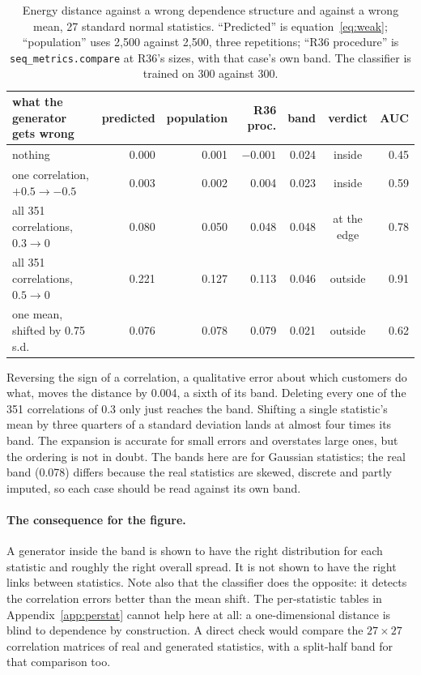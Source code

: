 \documentclass[11pt]{article}
\begin{document}
\begin{table}[h]
\centering
\small
\caption{Energy distance against a wrong dependence structure and against a
wrong mean, 27 standard normal statistics. ``Predicted'' is
equation~\eqref{eq:weak}; ``population'' uses 2,500 against 2,500, three
repetitions; ``R36 procedure'' is \texttt{seq\_metrics.compare} at R36's sizes,
with that case's own band. The classifier is trained on 300 against 300.}
\label{tab:weak}
\begin{tabular}{@{}lrrrrcr@{}}
\toprule
what the generator gets wrong & predicted & population & R36 proc. & band & verdict & AUC \\
\midrule
nothing & 0.000 & 0.001 & $-0.001$ & 0.024 & inside & 0.45 \\
one correlation, $+0.5 \to -0.5$ & 0.003 & 0.002 & 0.004 & 0.023 & inside & 0.59 \\
all 351 correlations, $0.3 \to 0$ & 0.080 & 0.050 & 0.048 & 0.048 & at the edge & 0.78 \\
all 351 correlations, $0.5 \to 0$ & 0.221 & 0.127 & 0.113 & 0.046 & outside & 0.91 \\
one mean, shifted by 0.75 s.d. & 0.076 & 0.078 & 0.079 & 0.021 & outside & 0.62 \\
\bottomrule
\end{tabular}
\end{table}

\noindent Reversing the sign of a correlation, a qualitative error about which
customers do what, moves the distance by 0.004, a sixth of its band. Deleting
every one of the 351 correlations of 0.3 only just reaches the band. Shifting a
single statistic's mean by three quarters of a standard deviation lands at
almost four times its band. The expansion is accurate for small errors and
overstates large ones, but the ordering is not in doubt. The bands here are for
Gaussian statistics; the real band (0.078) differs because the real statistics
are skewed, discrete and partly imputed, so each case should be read against
its own band.

\paragraph{The consequence for the figure.} A generator inside the band is
shown to have the right distribution for each statistic and roughly the right
overall spread. It is not shown to have the right links between statistics.
Note also that the classifier does the opposite: it detects the correlation
errors better than the mean shift. The per-statistic tables in
Appendix~\ref{app:perstat} cannot help here at all: a one-dimensional distance
is blind to dependence by construction. A direct check would compare the
$27\times27$ correlation matrices of real and generated statistics, with a
split-half band for that comparison too.
\end{document}
